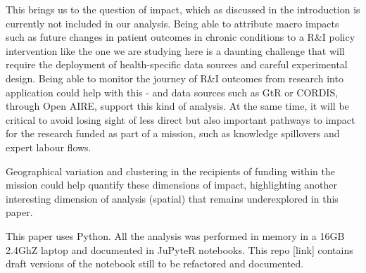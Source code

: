 \documentclass[11pt]{article}
\begin{document}
This brings us to the question of impact, which as discussed in the introduction is currently not included in our analysis. Being able to attribute macro impacts such as future changes in patient outcomes in chronic conditions to a R&I policy intervention like the one we are studying here is a daunting challenge that will require the deployment of health-specific data
sources and careful experimental design. Being able to monitor the journey of R&I outcomes from research into application could help with this - and data sources such as GtR or CORDIS, through Open AIRE, support this kind of analysis. At the same time, it will be critical to avoid losing sight of less direct but also important pathways to impact for the research funded as part of a mission, such as knowledge spillovers and expert labour flows.

Geographical variation and clustering in the recipients of funding within the mission could help quantify these dimensions of impact, highlighting another interesting dimension of analysis (spatial) that remains underexplored in this paper. 

This paper uses Python. All the analysis was performed in memory in a 16GB 2.4GhZ laptop and documented in JuPyteR notebooks. This repo [link] contains draft versions of the notebook still to be refactored and documented.


%
\end{document}
